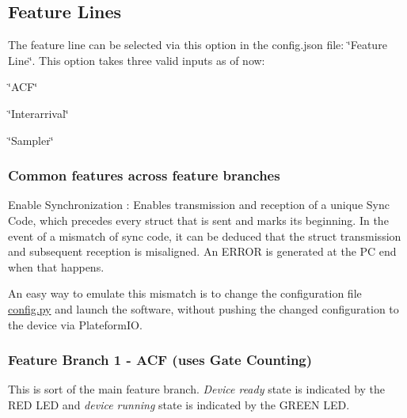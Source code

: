 \subsection*{Feature Lines}

The feature line can be selected via this option in the {\ttfamily config.\+json} file\+: {\ttfamily \char`\"{}\+Feature Line\char`\"{}}. This option takes three valid inputs as of now\+:


\begin{DoxyEnumerate}
\item {\ttfamily \char`\"{}\+A\+C\+F\char`\"{}}
\item {\ttfamily \char`\"{}\+Interarrival\char`\"{}}
\item {\ttfamily \char`\"{}\+Sampler\char`\"{}}
\end{DoxyEnumerate}

\subsubsection*{Common features across feature branches}


\begin{DoxyItemize}
\item {\ttfamily Enable Synchronization} \+: Enables transmission and reception of a unique {\ttfamily Sync Code}, which precedes every struct that is sent and marks its beginning. In the event of a mismatch of sync code, it can be deduced that the struct transmission and subsequent reception is misaligned. An E\+R\+R\+OR is generated at the PC end when that happens.

An easy way to emulate this mismatch is to change the configuration file {\ttfamily \hyperlink{config_8py}{config.\+py}} and launch the software, without pushing the changed configuration to the device via Plateform\+IO.
\end{DoxyItemize}

\subsubsection*{Feature Branch 1 -\/ {\ttfamily A\+CF} (uses Gate Counting)}

This is sort of the main feature branch. {\itshape Device ready} state is indicated by the {\ttfamily R\+ED L\+ED} and {\itshape device running} state is indicated by the {\ttfamily G\+R\+E\+EN L\+ED}.


